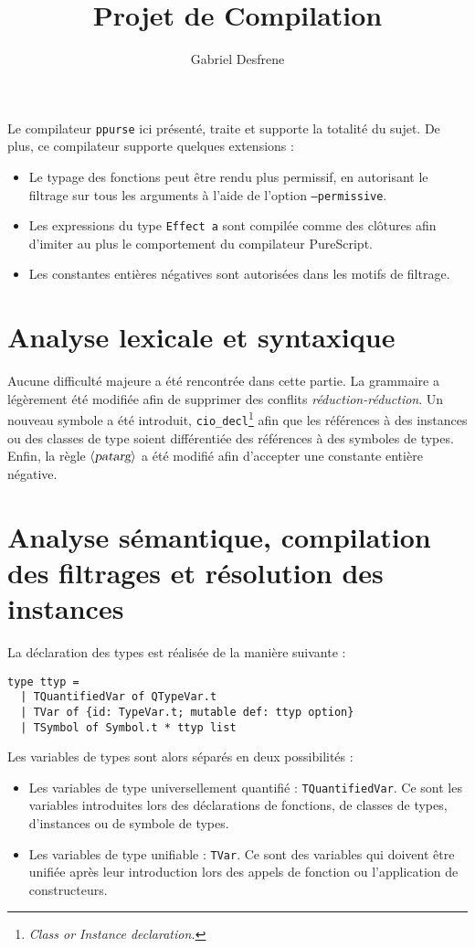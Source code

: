 \documentclass[french, 12pt]{article}
\title{{\large Projet de Compilation}\\\pps}
\author{Gabriel Desfrene}
\newcommand{\ps}{\textsf{PureScript}}
\begin{document}
\maketitle

Le compilateur \texttt{ppurse} ici présenté, traite et supporte la totalité du
sujet. De plus, ce compilateur supporte quelques extensions :
\begin{itemize}
    \item Le typage des fonctions peut être rendu plus permissif, en autorisant
          le filtrage sur tous les arguments à l'aide de l'option
          \texttt{---permissive}.
    \item Les expressions du type \texttt{Effect a} sont compilée comme des
          clôtures afin d'imiter au plus le comportement du compilateur \ps.
    \item Les constantes entières négatives sont autorisées dans les motifs de
          filtrage.
\end{itemize}

\section*{Analyse lexicale et syntaxique}
Aucune difficulté majeure a été rencontrée dans cette partie. La grammaire a
légèrement été modifiée afin de supprimer des conflits
\emph{réduction-réduction}. Un nouveau symbole a été introduit,
\texttt{cio\_decl}\footnote{\it Class or Instance declaration.} afin que les
références à des instances ou des classes de type soient différentiée des
références à des symboles de types. Enfin, la règle
$\left\langle\textsl{patarg}\right\rangle$ a été modifié afin d'accepter une
constante entière négative.

\section*{Analyse sémantique, compilation des filtrages et résolution des instances}
La déclaration des types est réalisée de la manière suivante :
\begin{verbatim}
type ttyp =
  | TQuantifiedVar of QTypeVar.t
  | TVar of {id: TypeVar.t; mutable def: ttyp option}
  | TSymbol of Symbol.t * ttyp list
\end{verbatim}

Les variables de types sont alors séparés en deux possibilités :
\begin{itemize}
    \item Les variables de type universellement quantifié : \verb|TQuantifiedVar|.
          Ce sont les variables introduites lors des déclarations de fonctions,
          de classes de types, d'instances ou de symbole de types.
    \item Les variables de type unifiable : \verb|TVar|. Ce sont des variables
          qui doivent être unifiée après leur introduction lors des appels de
          fonction ou l'application de constructeurs.
\end{itemize}
\end{document}
